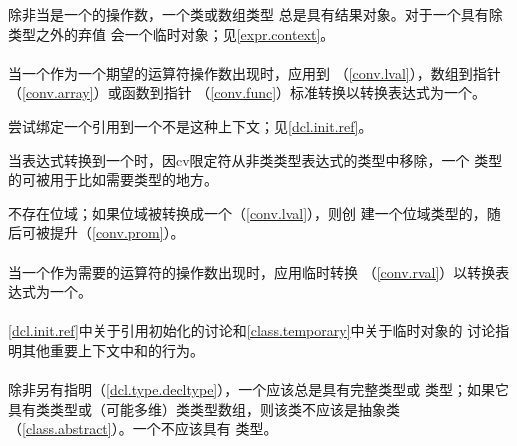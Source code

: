\begin{note}
  除非当\prvalue{}是一个的操作数，一个类或数组类型
  \prvalue{}总是具有结果对象。对于一个具有除 类型之外的弃值
  \prvalue{}会\mat{}一个临时对象；见\ref{expr.context}。
\end{note}

\paragraph{} %
当一个\glvalue{}作为一个期望\prvalue{}的运算符操作数出现时，应用\lvalue{}到
\rvalue{}（\ref{conv.lval}），数组到指针（\ref{conv.array}）或函数到指针
（\ref{conv.func}）标准转换以转换表达式为一个\prvalue{}。

\begin{note}
  尝试绑定一个\rvalue{}引用到一个\lvalue{}不是这种上下文；见\ref{dcl.init.ref}。
\end{note}

\begin{note}
  当表达式转换到一个\prvalue{}时，因cv限定符从非类类型表达式的类型中移除，一个
  类型的\lvalue{}可被用于比如需要类型\prvalue{}的地方。
\end{note}

\begin{note}
  不存在\prvalue{}位域；如果位域被转换成一个\prvalue{}（\ref{conv.lval}），则创
  建一个位域类型的\prvalue{}，随后可被提升（\ref{conv.prom}）。
\end{note}

\paragraph{} %
当一个\prvalue{}作为需要\glvalue{}的运算符的操作数出现时，应用临时\mat{}转换
（\ref{conv.rval}）以转换表达式为一个\xvalue{}。

\paragraph{} %
\ref{dcl.init.ref}中关于引用初始化的讨论和\ref{class.temporary}中关于临时对象的
讨论指明其他重要上下文中\lvalue{}和\rvalue{}的行为。

\paragraph{} %
除非另有指明（\ref{dcl.type.decltype}），一个\prvalue{}应该总是具有完整类型或
类型；如果它具有类类型或（可能多维）类类型数组，则该类不应该是抽象类
（\ref{class.abstract}）。一个\glvalue{}不应该具有 类型。

